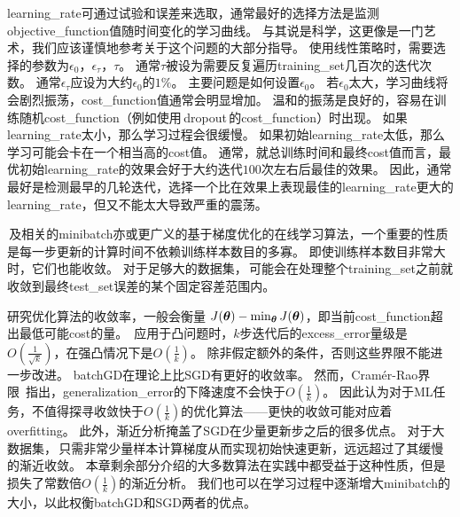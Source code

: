 
\gls{learning_rate}可通过试验和误差来选取，通常最好的选择方法是监测\gls{objective_function}值随时间变化的学习曲线。
与其说是科学，这更像是一门艺术，我们应该谨慎地参考关于这个问题的大部分指导。
使用线性策略时，需要选择的参数为$\epsilon_0$，$\epsilon_\tau$，$\tau$。  
通常$\tau$被设为需要反复遍历\gls{training_set}几百次的迭代次数。
通常$\epsilon_\tau$应设为大约$\epsilon_0$的$1\%$。
主要问题是如何设置$\epsilon_0$。
若$\epsilon_0$太大，学习曲线将会剧烈振荡，\gls{cost_function}值通常会明显增加。
温和的振荡是良好的，容易在训练随机\gls{cost_function}（例如使用\,\gls{dropout}\,的\gls{cost_function}）时出现。
如果\gls{learning_rate}太小，那么学习过程会很缓慢。
如果初始\gls{learning_rate}太低，那么学习可能会卡在一个相当高的\gls{cost}值。
通常，就总训练时间和最终\gls{cost}值而言，最优初始\gls{learning_rate}的效果会好于大约迭代$100$次左右后最佳的效果。
因此，通常最好是检测最早的几轮迭代，选择一个比在效果上表现最佳的\gls{learning_rate}更大的\gls{learning_rate}，但又不能太大导致严重的震荡。  


\,及相关的\gls{minibatch}亦或更广义的基于梯度优化的在线学习算法，一个重要的性质是每一步更新的计算时间不依赖训练样本数目的多寡。
即使训练样本数目非常大时，它们也能收敛。
对于足够大的数据集，\,可能会在处理整个\gls{training_set}之前就收敛到最终\gls{test_set}误差的某个固定容差范围内。



研究优化算法的收敛率，一般会衡量 $J(\boldsymbol{\theta}) - \min_{\boldsymbol{\theta}} J(\boldsymbol{\theta})$，即当前\gls{cost_function}超出最低可能\gls{cost}的量。
\,应用于凸问题时，$k$步迭代后的\gls{excess_error}量级是$O(\frac{1}{\sqrt{k}})$，在强凸情况下是$O(\frac{1}{k})$。
除非假定额外的条件，否则这些界限不能进一步改进。
\gls{batch}\gls{GD}在理论上比\gls{SGD}有更好的收敛率。
然而，Cram\'er-Rao界限~\citep{Cramer-1946,Rao-1945}指出，\gls{generalization_error}的下降速度不会快于$O(\frac{1}{k})$。
\cite{bottou-bousquet-2008-small}因此认为对于\gls{ML}任务，不值得探寻收敛快于$O(\frac{1}{k})$的优化算法——更快的收敛可能对应着\gls{overfitting}。
此外，渐近分析掩盖了\gls{SGD}在少量更新步之后的很多优点。
对于大数据集，\,只需非常少量样本计算梯度从而实现初始快速更新，远远超过了其缓慢的渐近收敛。
本章剩余部分介绍的大多数算法在实践中都受益于这种性质，但是损失了常数倍$O(\frac{1}{k})$的渐近分析。
我们也可以在学习过程中逐渐增大\gls{minibatch}的大小，以此权衡\gls{batch}\gls{GD}和\gls{SGD}两者的优点。

